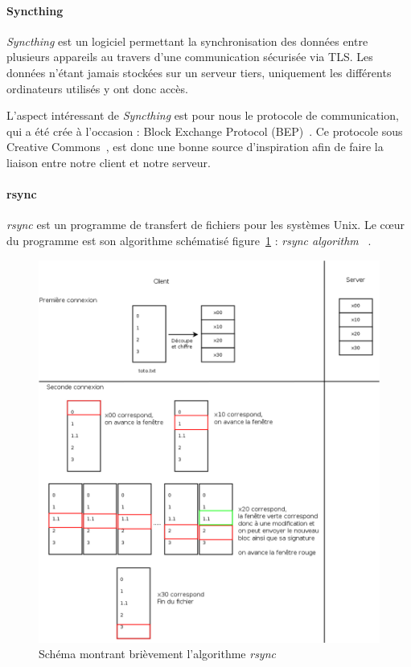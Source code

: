 \documentclass[a4paper,10pt, twoside]{report}
\begin{document}
\begin{spacing}{1.2}
\paragraph{Syncthing\\}
\textit{Syncthing} est un logiciel permettant la synchronisation des donn\'ees
entre plusieurs appareils au travers d'une communication s\'ecuris\'ee via TLS.
Les donn\'ees n'\'etant jamais stock\'ees sur un serveur tiers, uniquement les
diff\'erents ordinateurs utilis\'es y ont donc acc\`es.

L'aspect int\'eressant de \textit{Syncthing} est pour nous le protocole de
communication, qui a \'et\'e cr\'ee \`a l'occasion : Block Exchange Protocol
(BEP)~\cite{refBEP}. Ce protocole sous Creative Commons~\cite{refCC4.0}, est
donc une bonne source d'inspiration afin de faire la liaison entre notre client
et notre serveur.

\paragraph{rsync\\}
\textit{rsync} est un programme de transfert de fichiers pour les syst\`emes
Unix. Le c\oe ur du programme est son algorithme sch\'ematis\'e
figure~\ref{rsyncAlgo} :
\textit{\flqq rsync algorithm \frqq}~\cite{refRsyncAlgo}.

\begin{figure}[h!]
    \centering
    \includegraphics[width=15cm]{algo/rsyncalgo.png}
    \caption{\label{rsyncAlgo} Sch\'ema montrant bri\`evement
    l'algorithme \textit{rsync}}
\end{figure}


\end{spacing}
\end{document}
